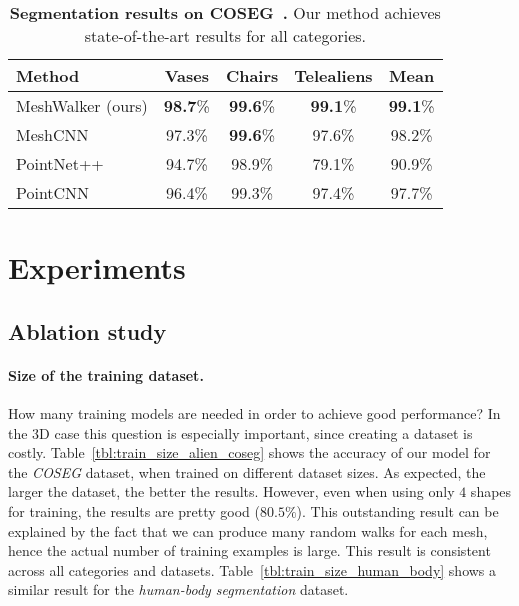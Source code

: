 \documentclass[acmtog]{acmart}
\begin{document}
\begin{table}[htb]\caption{{\bf Segmentation results on COSEG~\cite{wang2012active}.}
Our method achieves state-of-the-art results for all categories.
} 
\begin{center}
 \begin{tabular}{||l c c c c||} 
 \hline
 Method & Vases  & Chairs & Telealiens & Mean\\ [0.5ex] 
 \hline\hline\hline
 MeshWalker (ours) & \textbf{98.7}\% & \textbf{99.6}\% & \textbf{99.1}\% & \textbf{99.1}\% \\ 
 \hline
 MeshCNN & 97.3\% & \textbf{99.6}\% & 97.6\% & 98.2\% \\
 \hline\hline
 PointNet++ & 94.7\% & 98.9\% & 79.1\% & 90.9\% \\
 \hline
 PointCNN~\cite{li2018pointcnn} & 96.4\% & 99.3\% & 97.4\% & 97.7\% \\
 \hline
\end{tabular}
\label{tbl:coseg}
\end{center}
\end{table}



\section{Experiments}
\label{sec:experiments}


\subsection{Ablation study}

\paragraph{Size of the training dataset.}
\label{subsec:size_training_set}
How many training models are needed in order to achieve good performance?
In the 3D case this question is especially important, since creating a dataset is costly.
Table~\ref{tbl:train_size_alien_coseg} shows the accuracy of our model for the {\em COSEG} dataset, when trained on different dataset sizes.
As expected, the larger the dataset, the better the results.
However, even when using only $4$ shapes for training, the results are pretty good ($80.5\%$). 
This outstanding result can be explained by the fact that 
we can produce many random walks for each mesh, hence the actual number of training examples is large. 
This result is consistent across all categories and datasets.
Table~\ref{tbl:train_size_human_body} shows a similar result for the  {\em human-body segmentation} dataset.
\end{document}
